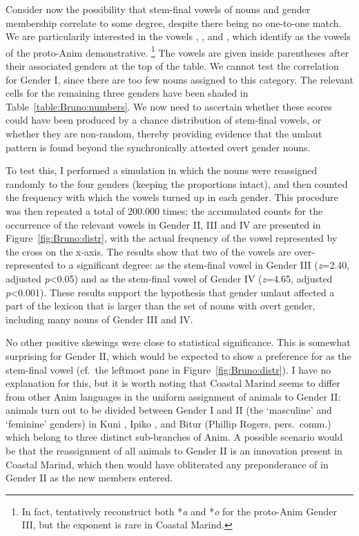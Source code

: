 \documentclass[output=collectionpaper]{langsci/langscibook}
\begin{document}
Consider now the possibility that stem-final vowels of nouns and gender membership correlate to some degree, despite there being no one-to-one match. We are particularily interested in the vowels , ,  and , which \textcite{Usher2015} identify as the vowels of the proto-Anim demonstrative.%
\footnote{In fact, \textcite[119]{Usher2015} tentatively reconstruct both *\emph{a} and *\emph{o} for the proto-Anim Gender III, but the exponent  is rare in Coastal Marind.} %
The vowels are given inside parentheses after their associated genders at the top of the table.
We cannot test the correlation for Gender I, since there are too few nouns assigned to this category. The relevant cells for the remaining three genders have been shaded in Table~\ref{table:Bruno:numbers}. We now need to ascertain whether these scores could have been produced by a chance distribution of stem-final vowels, or whether they are non-random, thereby providing evidence that the umlaut pattern is found beyond the synchronically attested overt gender nouns.

To test this, I performed a simulation in which the nouns were reassigned randomly to the four genders (keeping the proportions intact), and then counted the frequency with which the vowels turned up in each gender. This procedure was then repeated a total of 200.000 times; the accumulated counts for the occurrence of the relevant vowels in Gender II, III and IV are presented in Figure~\ref{fig:Bruno:distr}, with the actual frequency of the vowel represented by the cross on the x-axis. The results show that two of the vowels are over-represented to a significant degree:  as the stem-final vowel in Gender III (\emph{z}=2.40, adjusted \emph{p}<0.05) and  as the stem-final vowel of Gender IV (\emph{z}=4.65, adjusted \emph{p}<0.001). These results support the hypothesis that gender umlaut  affected a part of the lexicon that is larger than the set of nouns with overt gender, including many nouns of Gender III and IV.

No other positive skewings were close to statistical significance. This is somewhat surprising for Gender II, which would be expected to show a preference for  as the stem-final vowel (cf.\ the leftmost pane in Figure~\ref{fig:Bruno:distr}). I have no explanation for this, but it is worth noting that Coastal Marind seems to differ from other Anim languages in the uniform assignment of animals to Gender II: animals turn out to be divided between Gender I and II (the `masculine' and `feminine' genders) in Kuni \parencite[9]{Edwards-Fumey2007}, Ipiko \citep[117, examples 16--17]{Usher2015}, and Bitur (Phillip Rogers, pers.\ comm.\@) which belong to three distinct sub-branches of Anim. A possible scenario would be that the reassignment of all animals to Gender II is an innovation present in Coastal Marind, which then would have obliterated any preponderance of  in Gender II as the new members entered.
\end{document}
